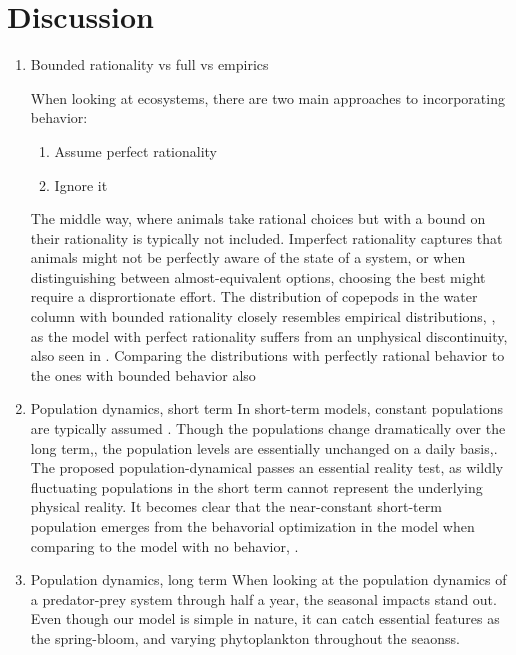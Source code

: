\section{Discussion}
\begin{enumerate}
  \item Bounded rationality vs full vs empirics

  When looking at ecosystems, there are two main approaches to incorporating behavior:
  \begin{enumerate}
    \item Assume perfect rationality
    \item Ignore it
  \end{enumerate}
  The middle way, where animals take rational choices but with a bound on their rationality is typically not included. Imperfect rationality captures that animals might not be perfectly aware of the state of a system, or when distinguishing between almost-equivalent options, choosing the best might require a disprortionate effort. The distribution of copepods in the water column with bounded rationality closely resembles empirical distributions, \citep{thomasetal}, as the model with perfect rationality suffers from an unphysical discontinuity, also seen in \citep{uhth}. Comparing the distributions with perfectly rational behavior to the ones with bounded behavior also

  \item Population dynamics, short term
In short-term models, constant populations are typically assumed \citep{...,...,...}. Though the populations change dramatically over the long term,, the population levels are essentially unchanged on a daily basis,. The proposed population-dynamical passes an essential reality test, as wildly fluctuating populations in the short term cannot represent the underlying physical reality. It becomes clear that the near-constant short-term population emerges from the behavorial optimization in the model when comparing to the model with no behavior, .


  \item Population dynamics, long term
  When looking at the population dynamics of a predator-prey system through half a year, the seasonal impacts stand out. Even though our model is simple in nature, it can catch essential features as the spring-bloom, and varying phytoplankton throughout the seaonss.


\end{enumerate}
